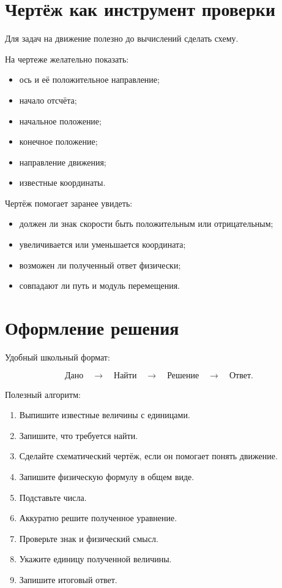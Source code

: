 \documentclass[a4paper,12pt]{article}
\begin{document}
\section{Чертёж как инструмент проверки}

Для задач на движение полезно до вычислений сделать схему.

На чертеже желательно показать:

\begin{itemize}
  \item ось и её положительное направление;
  \item начало отсчёта;
  \item начальное положение;
  \item конечное положение;
  \item направление движения;
  \item известные координаты.
\end{itemize}

Чертёж помогает заранее увидеть:

\begin{itemize}
  \item должен ли знак скорости быть положительным или отрицательным;
  \item увеличивается или уменьшается координата;
  \item возможен ли полученный ответ физически;
  \item совпадают ли путь и модуль перемещения.
\end{itemize}

\section{Оформление решения}

Удобный школьный формат:

\[
\text{Дано}\quad\longrightarrow\quad
\text{Найти}\quad\longrightarrow\quad
\text{Решение}\quad\longrightarrow\quad
\text{Ответ}.
\]

Полезный алгоритм:

\begin{enumerate}
  \item Выпишите известные величины с единицами.
  \item Запишите, что требуется найти.
  \item Сделайте схематический чертёж, если он помогает понять движение.
  \item Запишите физическую формулу в общем виде.
  \item Подставьте числа.
  \item Аккуратно решите полученное уравнение.
  \item Проверьте знак и физический смысл.
  \item Укажите единицу полученной величины.
  \item Запишите итоговый ответ.
\end{enumerate}
\end{document}

